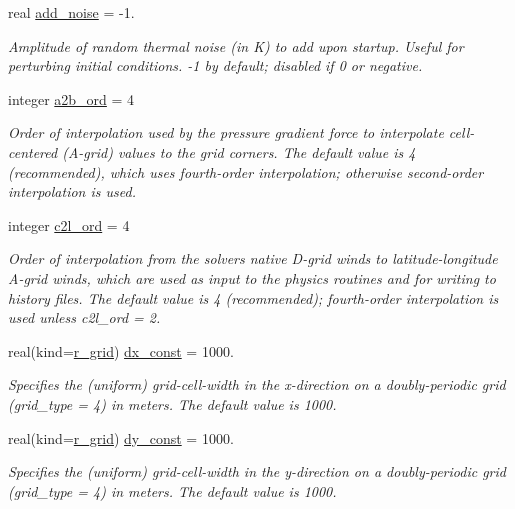 \begin{DoxyCompactItemize}
real \hyperlink{structfv__arrays__mod_1_1fv__flags__type_ab60e81c0576720da7727e7fefc3c4ddd}{add\-\_\-noise} = -\/1.
\begin{DoxyCompactList}\small\item\em Amplitude of random thermal noise (in K) to add upon startup. Useful for perturbing initial conditions. -\/1 by default; disabled if 0 or negative. \end{DoxyCompactList}\item 
integer \hyperlink{structfv__arrays__mod_1_1fv__flags__type_a0a9a9ada154a790c93d1f76bee1b7063}{a2b\-\_\-ord} = 4
\begin{DoxyCompactList}\small\item\em Order of interpolation used by the pressure gradient force to interpolate cell-\/centered (A-\/grid) values to the grid corners. The default value is 4 (recommended), which uses fourth-\/order interpolation; otherwise second-\/order interpolation is used. \end{DoxyCompactList}\item 
integer \hyperlink{structfv__arrays__mod_1_1fv__flags__type_a18295dfd8de10252dc53c6aa6113c5b1}{c2l\-\_\-ord} = 4
\begin{DoxyCompactList}\small\item\em Order of interpolation from the solvers native D-\/grid winds to latitude-\/longitude A-\/grid winds, which are used as input to the physics routines and for writing to history files. The default value is 4 (recommended); fourth-\/order interpolation is used unless c2l\-\_\-ord = 2. \end{DoxyCompactList}\item 
real(kind=\hyperlink{classfv__arrays__mod_ab0ba8527d270f349a84fa0a330be1923}{r\-\_\-grid}) \hyperlink{structfv__arrays__mod_1_1fv__flags__type_a5137df19dc239f4d7eb79d396eb1a7d5}{dx\-\_\-const} = 1000.
\begin{DoxyCompactList}\small\item\em Specifies the (uniform) grid-\/cell-\/width in the x-\/direction on a doubly-\/periodic grid (grid\-\_\-type = 4) in meters. The default value is 1000. \end{DoxyCompactList}\item 
real(kind=\hyperlink{classfv__arrays__mod_ab0ba8527d270f349a84fa0a330be1923}{r\-\_\-grid}) \hyperlink{structfv__arrays__mod_1_1fv__flags__type_af64867f4de73d082ab57aab0a919e78e}{dy\-\_\-const} = 1000.
\begin{DoxyCompactList}\small\item\em Specifies the (uniform) grid-\/cell-\/width in the y-\/direction on a doubly-\/periodic grid (grid\-\_\-type = 4) in meters. The default value is 1000. \end{DoxyCompactList}\item 

\end{DoxyCompactItemize}
